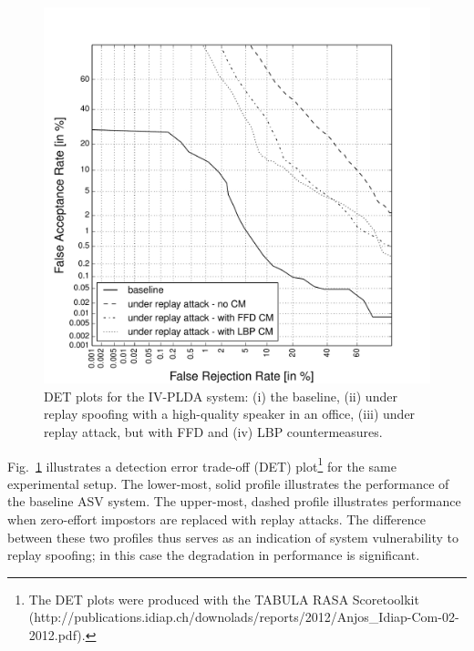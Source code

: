 \begin{figure}[!t]
	\centering
	\includegraphics[width=1\linewidth]{Figs/DET_IVPLDA_counter_Behr.pdf}
	\caption{DET plots for the IV-PLDA system: (i) the baseline, (ii) under replay spoofing with a high-quality speaker in an office, (iii) under replay attack, but with FFD and (iv) LBP countermeasures.}

	\label{fig::DETs_replay_IV}
\end{figure}


Fig.~\ref{fig::DETs_replay_IV} illustrates a detection error trade-off (DET) plot\footnote{The DET plots were produced with the TABULA RASA Scoretoolkit (http://publications.idiap.ch/downolads/reports/2012/Anjos\_Idiap-Com-02-2012.pdf).} for the same experimental setup.  The lower-most, solid profile illustrates the performance of the baseline ASV system.  The upper-most, dashed profile illustrates performance when zero-effort impostors are replaced with replay attacks.  The difference between these two profiles thus serves as an indication of system vulnerability to replay spoofing; in this case the degradation in performance is significant.  



